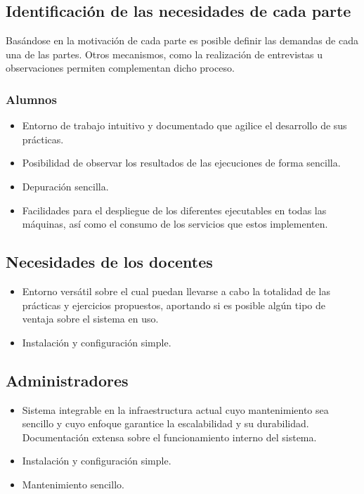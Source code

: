 \subsection{Identificación de las necesidades de cada parte}

Basándose en la motivación de cada parte es posible definir las demandas de cada una de las partes. Otros mecanismos, como la realización de entrevistas u observaciones permiten complementan dicho proceso.

\subsubsection{Alumnos}

\begin{itemize}
  \item Entorno de trabajo intuitivo y documentado que agilice el desarrollo de sus prácticas.
  \item Posibilidad de observar los resultados de las ejecuciones de forma sencilla.
  \item Depuración sencilla.
  \item Facilidades para el despliegue de los diferentes ejecutables en todas las máquinas, así como el consumo de los servicios que estos implementen.
\end{itemize}

\subsection{Necesidades de los docentes}

\begin{itemize}
  \item Entorno versátil sobre el cual puedan llevarse a cabo la totalidad de las prácticas y ejercicios propuestos, aportando si es posible algún tipo de ventaja sobre el sistema en uso.
  \item Instalación y configuración simple.
\end{itemize}

\subsection{Administradores}

\begin{itemize}
  \item Sistema integrable en la infraestructura actual cuyo mantenimiento sea sencillo y cuyo enfoque garantice la escalabilidad y su durabilidad. Documentación extensa sobre el funcionamiento interno del sistema.
  \item Instalación y configuración simple.
  \item Mantenimiento sencillo.
\end{itemize}

